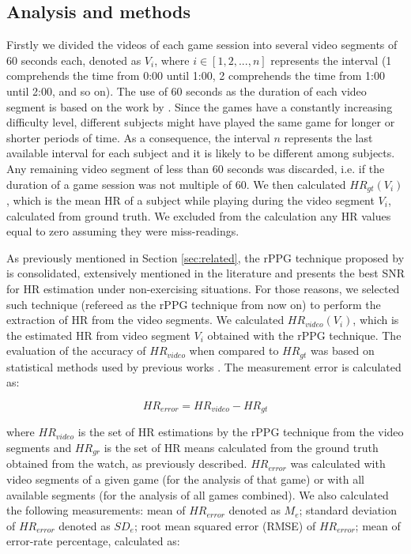 \subsection{Analysis and methods}
Firstly we divided the videos of each game session into several video segments of 60 seconds each, denoted as $V_i$, where $i \in [1, 2, ..., n]$ represents the interval (1 comprehends the time from 0:00 until 1:00, 2 comprehends the time from 1:00 until 2:00, and so on). The use of 60 seconds as the duration of each video segment is based on the work by \textcite{poh2011advancements}. Since the games have a constantly increasing difficulty level, different subjects might have played the same game for longer or shorter periods of time. As a consequence, the interval $n$ represents the last available interval for each subject and it is likely to be different among subjects. Any remaining video segment of less than 60 seconds was discarded, i.e. if the duration of a game session was not multiple of 60. We then calculated $HR_{gt}(V_i)$, which is the mean HR of a subject while playing during the video segment $V_i$, calculated from ground truth. We excluded from the calculation any HR values equal to zero assuming they were miss-readings.

As previously mentioned in Section \ref{sec:related}, the rPPG technique proposed by \textcite{poh2011advancements} is consolidated, extensively mentioned in the literature and presents the best SNR for HR estimation under non-exercising situations. For those reasons, we selected such technique (refereed as the rPPG technique from now on) to perform the extraction of HR from the video segments. We calculated $HR_{video}(V_i)$, which is the estimated HR from video segment $V_i$ obtained with the rPPG technique. The evaluation of the accuracy of $HR_{video}$ when compared to $HR_{gt}$ was based on statistical methods used by previous works \parencite{poh2011advancements, rouast2016remote, li2014remote}. The measurement error is calculated as:

\begin{equation}
\label{eqn:hr-error}
HR_{error} = HR_{video} - HR_{gt}
\end{equation}

where $HR_{video}$ is the set of HR estimations by the rPPG technique from the video segments and $HR_{gr}$ is the set of HR means calculated from the ground truth obtained from the watch, as previously described. $HR_{error}$ was calculated with video segments of a given game (for the analysis of that game) or with all available segments (for the analysis of all games combined). We also calculated the following measurements: mean of $HR_{error}$ denoted as $M_e$; standard deviation of $HR_{error}$ denoted as $SD_e$; root mean squared error (RMSE) of $HR_{error}$; mean of error-rate percentage, calculated as:

